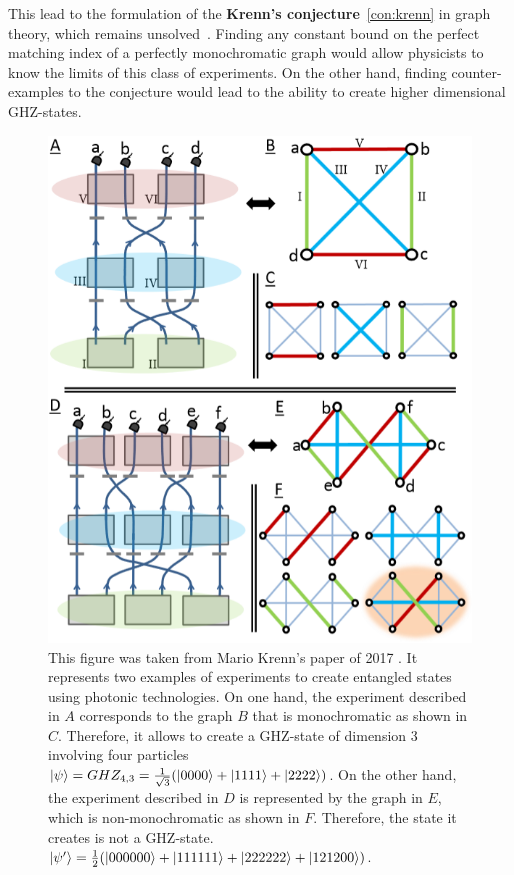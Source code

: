 This lead to the formulation of the \textbf{Krenn's conjecture}~\ref{con:krenn} in graph theory, which remains unsolved~\cite{wordpress}.
Finding any constant bound on the perfect matching index of a perfectly monochromatic graph would allow physicists to know the limits of this class of experiments.
On the other hand, finding counter-examples to the conjecture would lead to the ability to create higher dimensional GHZ-states. \\

\begin{figure}[H]
    \centering
    \includegraphics[scale=0.7]{figures/problem_presentation/motivations/krenn_graph}
    \caption{This figure was taken from Mario Krenn's paper of 2017 \cite{Krenn_2017}.
        It represents two examples of experiments to create entangled states using photonic technologies.
        On one hand, the experiment described in $A$ corresponds to the graph $B$ that is monochromatic as shown in $C$.
        Therefore, it allows to create a GHZ-state of dimension 3 involving four particles $\ket{\psi} = GHZ_{4, 3} = \frac{1}{\sqrt{3}} (\ket{0000} + \ket{1111} + \ket{2222})$.
        On the other hand, the experiment described in $D$ is represented by the graph in $E$, which is non-monochromatic as shown in $F$.
        Therefore, the state it creates is not a GHZ-state.
        $\ket{\psi'} = \frac{1}{2} (\ket{000000} + \ket{111111} + \ket{222222} + \ket{121200})$.}
    \label{fig:krenn_experiment}        %
\end{figure}

